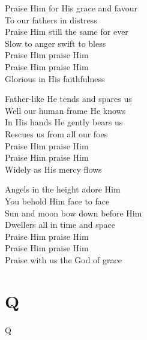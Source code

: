 \documentclass{beamer}
\begin{document}
{\begin{frame}{}
Praise Him for His grace and favour\\ 
To our fathers in distress\\ 
Praise Him still the same for ever\\ 
Slow to anger swift to bless\\ 
Praise Him praise Him\\ 
Praise Him praise Him\\ 
Glorious in His faithfulness 

\end{frame}

\hypertarget{Praise, my soul, the King of heaven[]3}{}
\begin{frame}{}
\fontsize{ 20 }{ 27 }\selectfont

Father-like He tends and spares us\\ 
Well our human frame He knows\\ 
In His hands He gently bears us\\ 
Rescues us from all our foes\\ 
Praise Him praise Him\\ 
Praise Him praise Him\\ 
Widely as His mercy flows 

\end{frame}

\hypertarget{Praise, my soul, the King of heaven[]4}{}
\begin{frame}{}
\fontsize{ 20 }{ 27 }\selectfont

Angels in the height adore Him\\ 
You behold Him face to face\\ 
Sun and moon bow down before Him\\ 
Dwellers all in time and space\\ 
Praise Him praise Him\\ 
Praise Him praise Him\\ 
Praise with us the God of grace 

\end{frame}

}
\section{Q}

\begin{frame}{Q}
\begin{columns}

    


    


\end{columns}

\end{frame}
\end{document}
